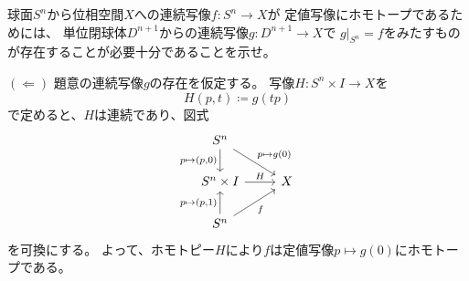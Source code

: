 \documentclass[report]{jlreq}
\begin{document}
\begin{answer}
    \TODO{}
\end{answer}

\begin{problem}[幾何学II 3.6]
    球面$S^n$から位相空間$X$への連続写像$f \colon S^n \to X$が
    定値写像にホモトープであるためには、
    単位閉球体$D^{n + 1}$からの連続写像$g \colon D^{n + 1} \to X$で
    $g|_{S^n} = f$をみたすものが存在することが必要十分であることを示せ。
\end{problem}

\begin{answer}
    $(\Leftarrow)$ \quad
    題意の連続写像$g$の存在を仮定する。
    写像$H \colon S^n \times I \to X$を
    \begin{equation}
        H(p, t) \coloneqq g(tp)
    \end{equation}
    で定めると、$H$は連続であり、図式
    \begin{equation}
        \begin{tikzcd}
            S^n \ar{d}[swap]{p \mapsto (p, 0)} \ar{rd}{p \mapsto g(0)} \\
            S^n \times I \ar{r}{H} & X \\
            S^n \ar{u}{p \mapsto (p, 1)} \ar{ru}[swap]{f}
        \end{tikzcd}
    \end{equation}
    を可換にする。
    よって、ホモトピー$H$により$f$は定値写像$p \mapsto g(0)$にホモトープである。


\end{answer}
\end{document}
